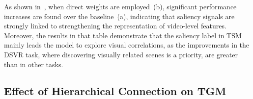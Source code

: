 \documentclass[10pt,twocolumn,letterpaper]{article}
\begin{document}
        As shown in~, when direct weights are employed~(b), significant performance increases are found over the baseline~(a), indicating that saliency signals are strongly linked to strengthening the representation of video-level features. Moreover, the results in that table demonstrate that the saliency label in TSM mainly leads the model to explore visual correlations, as the improvements in the DSVR task, where discovering visually related scenes is a priority, are greater than in other tasks.

        
    
        
    

    \subsection{Effect of Hierarchical Connection on TGM}\label{hcon_eff}
\end{document}
